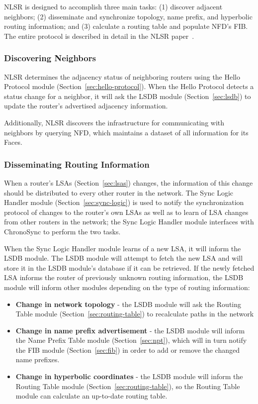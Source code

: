 NLSR is designed to accomplish three main tasks: (1) discover adjacent
neighbors; (2) disseminate and synchronize topology, name prefix, and
hyperbolic routing information; and (3) calculate a routing table and
populate NFD's FIB.  The entire protocol is described in detail in the
NLSR paper~\cite{NlsrTr}.

\subsubsection{Discovering Neighbors}

NLSR determines the adjacency status of neighboring routers using the Hello Protocol module (Section~\ref{sec:hello-protocol}).
When the Hello Protocol detects a status change for a neighbor, it will ask the LSDB module (Section~\ref{sec:lsdb}) to update the router's advertised adjacency information.

Additionally, NLSR discovers the infrastructure for communicating with
neighbors by querying NFD, which maintains a dataset of all
information for its Faces.

\subsubsection{Disseminating Routing Information}

When a router's LSAs (Section~\ref{sec:lsas}) changes, the information of this change should be distributed to every other router in the network.
The Sync Logic Handler module (Section~\ref{sec:sync-logic}) is used to notify the synchronization protocol of changes to the router's own LSAs as well as to learn of LSA changes from other routers in the network;
the Sync Logic Handler module interfaces with ChronoSync to perform the two tasks.

When the Sync Logic Handler module learns of a new LSA, it will inform the LSDB module.
The LSDB module will attempt to fetch the new LSA and will store it in the LSDB module's database if it can be retrieved.
If the newly fetched LSA informs the router of previously unknown routing information, the LSDB module will inform other modules depending on the type of routing information:
\begin{itemize}
  \item \textbf{Change in network topology} - the LSDB module will ask the Routing Table module (Section~\ref{sec:routing-table}) to recalculate paths in the network
\item \textbf{Change in name prefix advertisement} - the LSDB module will inform the Name Prefix Table module (Section~\ref{sec:npt}), which will in turn notify the FIB module (Section~\ref{sec:fib}) in order to add or remove the changed name prefixes.
\item \textbf{Change in hyperbolic coordinates} - the LSDB module will inform the Routing Table module (Section~\ref{sec:routing-table}), so the Routing Table module can calculate an up-to-date routing table.
\end{itemize}

